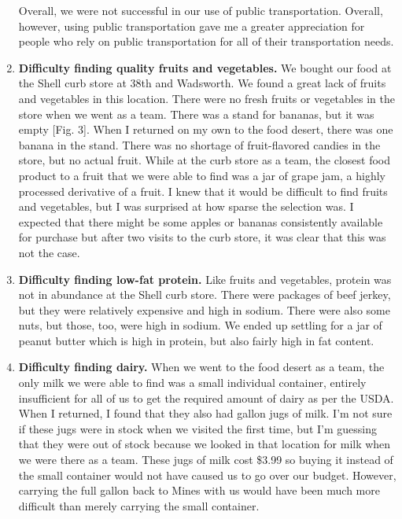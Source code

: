 \documentclass[11pt]{article}
\begin{document}
\begin{enumerate}
        Overall, we were not successful in our use of public transportation. Overall, however, using
        public transportation gave me a greater appreciation for people who rely on public
        transportation for all of their transportation needs.

    \item \textbf{Difficulty finding quality fruits and vegetables.} \label{itm:fruit}
        We bought our food at the Shell curb store at 38th and Wadsworth. We found a great lack of
        fruits and vegetables in this location. There were no fresh fruits or vegetables in the
        store when we went as a team. There was a stand for bananas, but it was empty [Fig. 3]. When
        I returned on my own to the food desert, there was one banana in the stand. There was no
        shortage of fruit-flavored candies in the store, but no actual fruit. While at the curb
        store as a team, the closest food product to a fruit that we were able to find was a jar of
        grape jam, a highly processed derivative of a fruit. I knew that it would be difficult to
        find fruits and vegetables, but I was surprised at how sparse the selection was. I expected
        that there might be some apples or bananas consistently available for purchase but after two
        visits to the curb store, it was clear that this was not the case.

    \item \textbf{Difficulty finding low-fat protein.} \label{itm:protein}
        Like fruits and vegetables, protein was not in abundance at the Shell curb store. There were
        packages of beef jerkey, but they were relatively expensive and high in sodium. There were
        also some nuts, but those, too, were high in sodium. We ended up settling for a jar of
        peanut butter which is high in protein, but also fairly high in fat content.

    \item \textbf{Difficulty finding dairy.} \label{itm:dairy}
        When we went to the food desert as a team, the only
        milk we were able to find was a small individual container, entirely insufficient for all of
        us to get the required amount of dairy as per the USDA. When I returned, I found that they
        also had gallon jugs of milk. I'm not sure if these jugs were in stock when we visited the
        first time, but I'm guessing that they were out of stock because we looked in that location
        for milk when we were there as a team. These jugs of milk cost \$3.99 so buying it instead
        of the small container would not have caused us to go over our budget. However, carrying the
        full gallon back to Mines with us would have been much more difficult than merely carrying
        the small container.


\end{enumerate}
\end{document}
